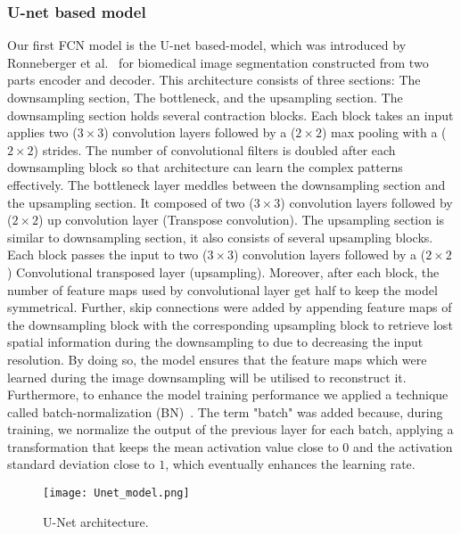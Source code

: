 \documentclass[preprint,9pt]{elsarticle}
\begin{document}
	\subsubsection{U-net based model}
	Our first FCN model is the U-net based-model, which was introduced by Ronneberger et al.~\cite{Ronneberger2015} for biomedical image segmentation constructed from two parts encoder and decoder. 
	This architecture consists of three sections: The downsampling section, The bottleneck, and the upsampling section. 
	The downsampling section holds several contraction blocks. 
	Each block takes an input applies two (\(3\times3\)) convolution layers followed by a (\(2\times2\)) max pooling with a (\(2\times2\)) strides. 
	The number of convolutional filters is doubled after each downsampling block so that architecture can learn the complex patterns effectively. 
	The bottleneck layer meddles between the downsampling section and the upsampling section. 
	It composed of two (\(3\times3\)) convolution layers followed by (\(2\times2\)) up convolution layer (Transpose convolution).
	The upsampling section is similar to downsampling section, it also consists of several upsampling blocks. 
	Each block passes the input to two (\(3\times3\)) convolution layers followed by a (\(2\times2\)) Convolutional transposed layer (upsampling). 
	Moreover, after each block, the number of feature maps used by convolutional layer get half to keep the model symmetrical. 
	Further, skip connections were added by appending feature maps of the downsampling block with the corresponding upsampling block to retrieve lost spatial information during the downsampling to due to decreasing the input resolution.
	By doing so, the model ensures that the feature maps which were learned during the image downsampling will be utilised to reconstruct it. 
	Furthermore, to enhance the model training performance we applied a technique called batch-normalization (BN)~\cite{Ioffe2015}.
	The term "batch" was added because, during training, we normalize the output of the previous layer for each batch, applying a transformation that keeps the mean activation value close to \(0\) and the activation standard deviation close to \(1\), which eventually enhances the learning rate.
	\begin{figure} [h!]
		\begin{center}
			\texttt{[image: Unet\_model.png]}
		\end{center}
		\caption{U-Net architecture.} 
		\label{fig:Unet}
	\end{figure}
\end{document}
